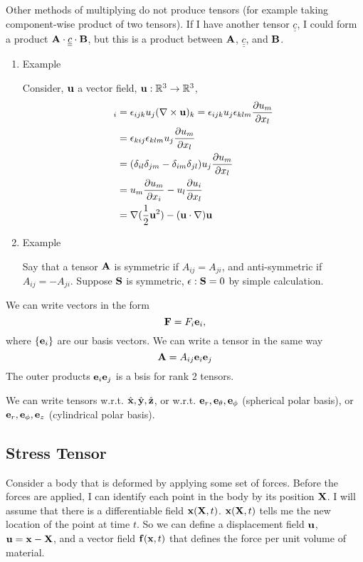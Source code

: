 \documentclass[12pt]{article}
\newcommand{\xx}{{\bf x}}
\newcommand{\ee}{{\bf e}}
\newcommand{\ff}{{\bf f}}
\newcommand{\uu}{{\bf u}}
\newcommand{\FF}{{\bf F}}
\newcommand{\bA}{{\bf A}}
\newcommand{\bB}{{\bf B}}
\newcommand{\bS}{{\bf S}}
\newcommand{\bX}{{\bf X}}
\newcommand{\bnabla}{{\bf \nabla}}
\newcommand{\cc}{{\underline{\underline c}}}
\newcommand{\RR}{{\mathbb R}}
\begin{document}
Other methods of multiplying do not produce tensors (for example taking component-wise product of two tensors).
If I have another tensor $\cc$, I could form a product $\bA\cdot\cc\cdot\bB$, but this is a product between $\bA$, $\cc$, and $\bB$.
\begin{enumerate}
\item{Example}

Consider, $\uu$ a vector field, $\uu: \RR^3 \to\RR^3$,
\begin{align*}
[\uu\times(\nabla\times\uu)]_i &= \epsilon_{ijk}u_j(\nabla\times\uu)_k = \epsilon_{ijk}u_j\epsilon_{klm}\frac{\partial u_m}{\partial x_l}\\
&=  \epsilon_{kij}\epsilon_{klm} u_j\frac{\partial u_m}{\partial x_l}\\
&=(\delta_{il}\delta_{jm} - \delta_{im}\delta_{jl})u_j\frac{\partial u_m}{\partial x_l}\\
&=u_m\frac{\partial u_m}{\partial x_i} - u_l\frac{\partial u_i}{\partial x_l}\\
&=\bnabla (\frac 1 2 \uu^2) - (\uu\cdot\bnabla)\uu
\end{align*}
\item{Example}

Say that a tensor $\bA$ is symmetric if $A_{ij} = A_{ji}$, and anti-symmetric if $A_{ij} =- A_{ji}$. Suppose $\bS$ is symmetric, $\epsilon:\bS = 0$ by simple calculation.
\end{enumerate}
We can write vectors in the form
\[
\FF = F_i\ee_i,
\]
where $\{\ee_i\}$ are our basis vectors. We can write a tensor in the same way
\[
\bA = A_{ij}\ee_i\ee_j
\]
The outer products $\ee_i\ee_j$ is a bsis for rank 2 tensors.

We can write tensors w.r.t. $\hat\xx, \hat{\bf y}, \hat{\bf z}$, or w.r.t. $\ee_r, \ee_{\theta}, \ee_{\phi}$ (spherical polar basis), or  $\ee_r, \ee_{\phi}, \ee_{z}$ (cylindrical polar basis).




\subsection{Stress Tensor}
Consider a body that is deformed by applying some set of forces. Before the forces are applied, I can identify each point in the body by its position $\bX$. I will assume that there is a differentiable field $\xx (\bX,t)$. $\xx (\bX,t)$ tells me the new location of the point at time $t$. So we can define a displacement field $\uu$, $\uu = \xx-\bX$, and a vector field $\ff(\xx,t)$ that defines the force per unit volume of material. 
\end{document}
